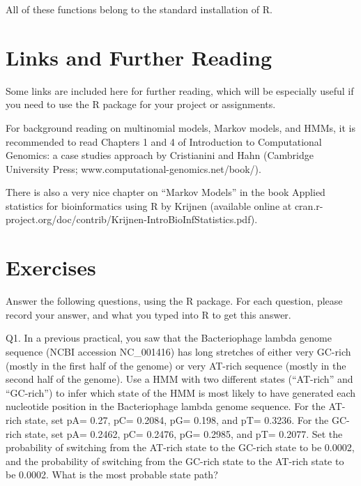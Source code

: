 \documentclass[
]{book}
\begin{document}
All of these functions belong to the standard installation of R.

\hypertarget{links-and-further-reading-2}{%
\section{Links and Further Reading}\label{links-and-further-reading-2}}

Some links are included here for further reading, which will be especially useful if you need to use the R package for your project or assignments.

For background reading on multinomial models, Markov models, and HMMs, it is recommended to read Chapters 1 and 4 of Introduction to Computational Genomics: a case studies approach by Cristianini and Hahn (Cambridge University Press; www.computational-genomics.net/book/).

There is also a very nice chapter on ``Markov Models'' in the book Applied statistics for bioinformatics using R by Krijnen (available online at cran.r-project.org/doc/contrib/Krijnen-IntroBioInfStatistics.pdf).

\hypertarget{exercises-3}{%
\section{Exercises}\label{exercises-3}}

Answer the following questions, using the R package. For each question, please record your answer, and what you typed into R to get this answer.

Q1. In a previous practical, you saw that the Bacteriophage lambda genome sequence (NCBI accession NC\_001416) has
long stretches of either very GC-rich (mostly in the first half of the genome) or very AT-rich sequence (mostly in the second half of the genome). Use a HMM with two different states (``AT-rich'' and ``GC-rich'') to infer which state of the HMM is most likely to have generated each nucleotide position in the Bacteriophage lambda genome sequence. For the AT-rich state, set pA= 0.27, pC= 0.2084, pG= 0.198, and pT= 0.3236. For the GC-rich state, set pA= 0.2462, pC= 0.2476, pG= 0.2985, and pT= 0.2077. Set the probability of switching from the AT-rich state to the GC-rich state to be 0.0002, and the
probability of switching from the GC-rich state to the AT-rich state to be 0.0002. What is the most probable state path?
\end{document}
